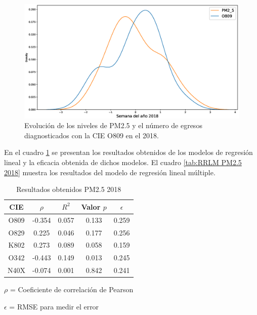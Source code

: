 \begin{figure}[h!]
\setcounter{figure}{3} %
\captionsetup{type=figure} %
\begin{center}
   \includegraphics[width=1\textwidth]{PM2_5_O809_2018.eps}
   \end{center}
    \caption[Series de tiempo 2018 PM2.5 Y O809]{Evolución de los niveles de PM2.5 y el número de egresos diagnosticados con la CIE O809 en el 2018.}
    \label{serie_de_tiempo_2018_PM25}
\end{figure}

En el cuadro \ref{tab:Resultados obtenidos PM2.5 2018} se presentan los resultados obtenidos de los modelos de regresión lineal y la eficacia obtenida de dichos modelos. El cuadro \ref{tab:RRLM PM2.5 2018} muestra los resultados del modelo de regresión lineal múltiple.

\begin{table}[hbt!]
\centering
\caption{Resultados obtenidos PM2.5 2018}
\label{tab:Resultados obtenidos PM2.5 2018}
\vspace{0.5cm}
\begin{threeparttable}
\begin{tabular}{|c|c|c|c|c|}
	\hline
	CIE & $\rho$ & $R^2$ & Valor $p$ & $\epsilon$\\
	\hline
	O809 & -0.354 & 0.057 & 0.133 & 0.259 \\
	\hline
	O829 & 0.225 & 0.046 & 0.177 & 0.256 \\
	\hline
	K802 & 0.273 & 0.089 & 0.058 & 0.159 \\
	\hline
	O342 & -0.443 & 0.149 & 0.013 & 0.245 \\
	\hline
	N40X & -0.074 & 0.001 & 0.842 & 0.241 \\
	\hline
\end{tabular}
\begin{tablenotes}
\footnotesize
\item{$\rho$ = Coeficiente de correlación de Pearson}
\item{$\epsilon$ = RMSE para medir el error}
\end{tablenotes}
\end{threeparttable}
\end{table}

